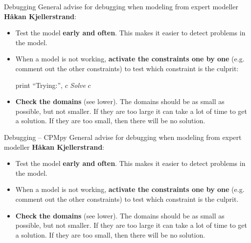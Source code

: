 \documentclass{cons-beamer}
\begin{document}
\begin{frame}{Debugging}
  General advise for debugging when modeling from expert modeller\textbf{ Håkan Kjellerstrand}:
  \vfill

  \begin{itemize}
    \item Test the model \textbf{early and often}. This makes it easier to detect problems in the model. \vfill

    \item When a model is not working, \textbf{activate the constraints one by one} (e.g. comment out the other constraints) to test which constraint is the culprit: 
          \vspace{-1.5em}
          \begin{algorithmic}
              \STATE print ``Trying:'', $c$
              \STATE \textit{Solve} $c$
            \ENDFOR
          \end{algorithmic}
          \vfill

    \item \textbf{Check the domains} (see lower). The domains should be as small as possible, but not smaller. If they are too large it can take a lot of time to get a solution. If they are too small, then there will be no solution. \vfill
  \end{itemize}
\end{frame}

\begin{flashcardcpmpy}
\begin{frame}{Debugging -- CPMpy}
  General advise for debugging when modeling from expert modeller\textbf{ Håkan Kjellerstrand}:
  \vfill

  \begin{itemize}
    \item Test the model \textbf{early and often}. This makes it easier to detect problems in the model. \vfill

    \item When a model is not working, \textbf{activate the constraints one by one} (e.g. comment out the other constraints) to test which constraint is the culprit. 
        \vfill

    \item \textbf{Check the domains} (see lower). The domains should be as small as possible, but not smaller. If they are too large it can take a lot of time to get a solution. If they are too small, then there will be no solution. \vfill
  \end{itemize}
\end{frame}
\end{flashcardcpmpy}
\end{document}
